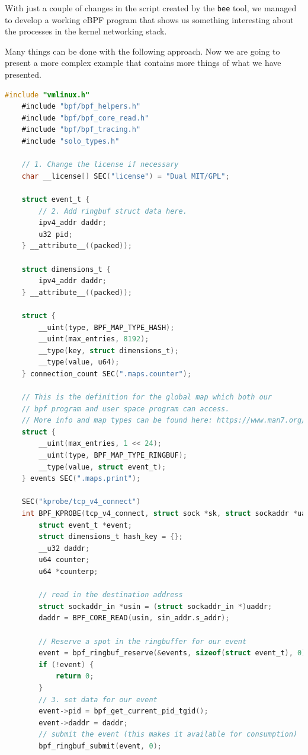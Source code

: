 With just a couple of changes in the script created by the \colorbox{backcolour}{\lstinline[style=commandline, language=bash, breaklines=true]|bee|} tool, we managed to develop a working eBPF program that shows us something interesting about the processes in the kernel networking stack.

Many things can be done with the following approach.
Now we are going to present a more complex example that contains more things of what we have presented.

\begin{lstlisting}[style=cstyle, language=C, caption={Code of the modified program starting from the first one created using \colorbox{backcolour}{\lstinline[style=commandline, language=bash]|bee|}.}]
	#include "vmlinux.h"
	#include "bpf/bpf_helpers.h"
	#include "bpf/bpf_core_read.h"
	#include "bpf/bpf_tracing.h"
	#include "solo_types.h"
	
	// 1. Change the license if necessary 
	char __license[] SEC("license") = "Dual MIT/GPL";
	
	struct event_t {
		// 2. Add ringbuf struct data here.
		ipv4_addr daddr;
		u32 pid;
	} __attribute__((packed));
	
	struct dimensions_t {
		ipv4_addr daddr;
	} __attribute__((packed));
	
	struct {
		__uint(type, BPF_MAP_TYPE_HASH);
		__uint(max_entries, 8192);
		__type(key, struct dimensions_t);
		__type(value, u64);
	} connection_count SEC(".maps.counter");
	
	// This is the definition for the global map which both our
	// bpf program and user space program can access.
	// More info and map types can be found here: https://www.man7.org/linux/man-pages/man2/bpf.2.html
	struct {
		__uint(max_entries, 1 << 24);
		__uint(type, BPF_MAP_TYPE_RINGBUF);
		__type(value, struct event_t);
	} events SEC(".maps.print");
	
	SEC("kprobe/tcp_v4_connect")
	int BPF_KPROBE(tcp_v4_connect, struct sock *sk, struct sockaddr *uaddr) {
		struct event_t *event;
		struct dimensions_t hash_key = {};
		__u32 daddr;
		u64 counter;
		u64 *counterp;
		
		// read in the destination address
		struct sockaddr_in *usin = (struct sockaddr_in *)uaddr;
		daddr = BPF_CORE_READ(usin, sin_addr.s_addr);
		
		// Reserve a spot in the ringbuffer for our event
		event = bpf_ringbuf_reserve(&events, sizeof(struct event_t), 0);
		if (!event) {
			return 0;
		}
		// 3. set data for our event
		event->pid = bpf_get_current_pid_tgid();
		event->daddr = daddr;
		// submit the event (this makes it available for consumption)
		bpf_ringbuf_submit(event, 0);
		

\end{lstlisting}
